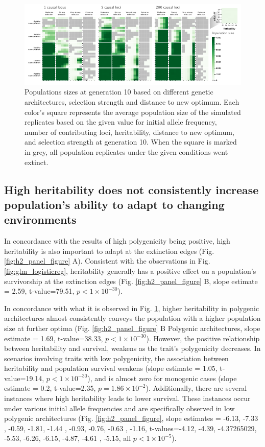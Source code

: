 \documentclass{article}
\begin{document}
\begin{figure}[H]
    \centering
    \includegraphics[width=1\textwidth]{figures/pop_size_GEN10.pdf}
    \caption{Populations sizes at generation 10 based on different genetic architectures, selection strength and distance to new optimum. Each color's square represents the average population size of the simulated replicates based on the given value for initial allele frequency, number of contributing loci, heritability, distance to new optimum, and selection strength at generation 10. When the square is marked in grey, all population replicates under the given conditions went extinct.}
    \label{fig:pop_size_poly_gen10}
\end{figure}

\subsection{High heritability does not consistently increase population's ability to adapt to changing environments}

In concordance with the results of high polygenicity being positive, high heritability is also  important to adapt at the extinction edges (Fig. \ref{fig:h2_panel_figure} A). Consistent with the observations in Fig. \ref{fig:glm_logisticreg}, heritability generally has a positive effect on a population's survivorship at the extinction edges (Fig. \ref{fig:h2_panel_figure} B, slope estimate = 2.59, t-value=79.51,  $p<1 \times 10^{-30}$).  

In concordance with what it is observed in Fig. \ref{fig:pop_size_poly_gen10}, higher heritability in polygenic architectures almost consistently conveys the population with a higher population size at further optima (Fig. \ref{fig:h2_panel_figure} B Polygenic architectures, slope estimate = 1.69, t-value=38.33,  $p<1 \times 10^{-30}$). However, the positive relationship between heritability and survival, weakens as the trait's polygenicity decreases. In scenarios involving traits with low polygenicity, the association between heritability and population survival weakens (slope estimate = 1.05, t-value=19.14,  $p<1 \times 10^{-30}$), and is almost zero for monogenic cases (slope estimate = 0.2, t-value=2.35,  $p=1.86 \times 10^{-2}$). Additionally, there are several instances where high heritability leads to lower survival. These instances occur under various initial allele frequencies and are specifically observed in low polygenic architectures (Fig. \ref{fig:h2_panel_figure}, slope estimates = -6.13, -7.33 , -0.59, -1.81, -1.44 , -0.93, -0.76, -0.63 , -1.16, t-values=-4.12, -4.39, -4.37265029, -5.53, -6.26, -6.15, -4.87, -4.61 , -5.15,  all $p<1 \times 10^{-5}$).
\end{document}
